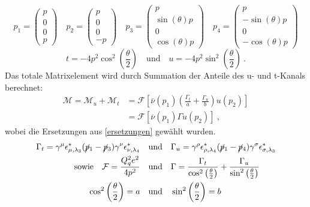 \begin{equation}
p_1 = \left(\begin{array}{c}p \\ 0 \\ 0 \\ p\end{array}\right) \quad 	p_2 = \left(\begin{array}{c}p \\ 0 \\ 0 \\ -p\end{array}\right) \quad p_3 = \left(\begin{array}{c}p \\ \sin(\theta)p \\ 0 \\ \cos(\theta)p \end{array}\right) \quad p_4 = \left(\begin{array}{c}p \\ -\sin(\theta)p \\ 0 \\ -\cos(\theta)p \end{array}\right)
\label{vierervektoren}
\end{equation}
\begin{equation}
\label{Mandelstam}
t  = -4 p^2 \cos^2\left(\frac{\theta}{2}\right) \quad \text{und} \quad u = -4p^2 \sin^2\left(\frac{\theta}{2}\right)~.
\end{equation} 
Das totale Matrixelement wird durch Summation der Anteile des u- und t-Kanals berechnet: 
\begin{equation}
\begin{aligned}
\mathcal{M} = \mathcal{M}_u + \mathcal{M}_t &= \mathcal{F} \left[\overline{\nu}(p_1) \left(\frac{\Gamma_t}{a}  +
\frac{\Gamma_u}{b} \right) u(p_2) \right] \\
&= \mathcal{F} \left[ \overline{\nu}(p_1) \Gamma u(p_2)\right]~,
\end{aligned}
\end{equation}
wobei die Ersetzungen  aus \textsf{\autoref{ersetzungen}} gewählt wurden.
\begin{equation}
\begin{split}
\Gamma_t = \gamma^\mu \epsilon^*_{\mu, \lambda_3} (\cancel{p}_1- \cancel{p}_3)  \gamma^\nu \epsilon^*_{\nu, \lambda_4} \quad &\text{und} \quad \Gamma_u = \gamma^\rho \epsilon^*_{\rho, \lambda_4} (\cancel{p}_1- \cancel{p}_4)  \gamma^\sigma \epsilon^*_{\sigma, \lambda_3} \\
\text{sowie} \quad \mathcal{F} = \frac{Q_q^2e^2}{4p^2} \quad &\text{und} \quad \Gamma = \frac{\Gamma_t}{\cos^2\left(\frac{\theta}{2}\right)}  +
\frac{\Gamma_u}{\sin^2\left(\frac{\theta}{2}\right)} \\
\cos^2\left(\frac{\theta}{2}\right) = a \quad &\text{und} \quad \sin^2\left(\frac{\theta}{2}\right) = b
\end{split}
\label{ersetzungen}
\end{equation}

